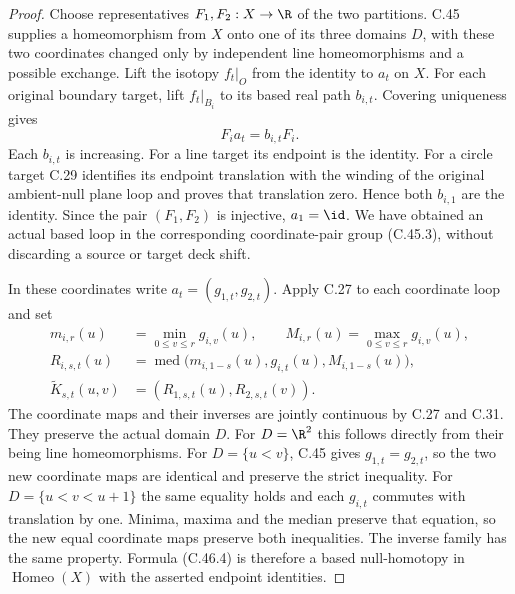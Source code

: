 \begin{proof}
Choose representatives $F_1,F_2:X\to\R$ of the two
partitions. C.45 supplies a homeomorphism from $X$
onto one of its three domains $D$, with these two
coordinates changed only by independent line
homeomorphisms and a possible exchange. Lift the
isotopy $f_t|_O$ from the identity to $a_t$ on $X$.
For each original boundary target, lift $f_t|_{B_i}$
to its based real path $b_{i,t}$. Covering uniqueness
gives
\[
                       F_i a_t=b_{i,t}F_i.              \tag{C.46.3}
\]
Each $b_{i,t}$ is increasing. For a line target its
endpoint is the identity. For a circle target C.29
identifies its endpoint translation with the winding
of the original ambient-null plane loop and proves
that translation zero. Hence both $b_{i,1}$ are the
identity. Since the pair $(F_1,F_2)$ is injective,
$a_1=\id$. We have obtained an actual based loop in
the corresponding coordinate-pair group (C.45.3),
without discarding a source or target deck shift.

In these coordinates write $a_t=(g_{1,t},g_{2,t})$.
Apply C.27 to each coordinate loop and set
\[
\begin{split}
 m_{i,r}(u)&=\min_{0\leq v\leq r}g_{i,v}(u),\qquad
 M_{i,r}(u)=\max_{0\leq v\leq r}g_{i,v}(u),\\
 R_{i,s,t}(u)&=\operatorname{med}
       \bigl(m_{i,1-s}(u),g_{i,t}(u),M_{i,1-s}(u)\bigr),\\
 \widetilde K_{s,t}(u,v)&=(R_{1,s,t}(u),R_{2,s,t}(v)).
\end{split}                                             \tag{C.46.4}
\]
The coordinate maps and their inverses are jointly
continuous by C.27 and C.31. They preserve the actual
domain $D$. For $D=\R^2$ this follows directly from
their being line homeomorphisms. For $D=\{u<v\}$,
C.45 gives $g_{1,t}=g_{2,t}$, so the two new coordinate
maps are identical and preserve the strict inequality.
For $D=\{u<v<u+1\}$ the same equality holds and each
$g_{i,t}$ commutes with translation by one. Minima,
maxima and the median preserve that equation, so the
new equal coordinate maps preserve both inequalities.
The inverse family has the same property. Formula
(C.46.4) is therefore a based null-homotopy in
$\operatorname{Homeo}(X)$ with the asserted endpoint
identities.


\end{proof}
